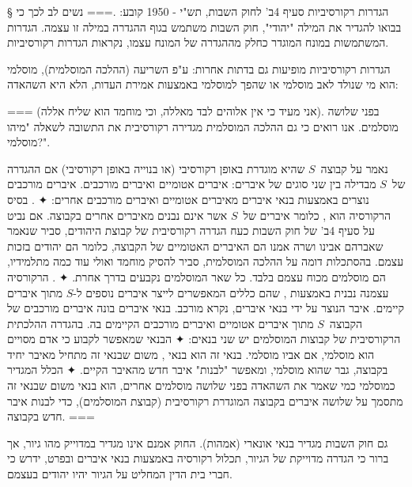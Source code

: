 § הגדרות רקורסיביות
סעיף 4ב' לחוק השבות, תש"י - 1950 קובע:
.===
נשים לב לכך כי בבואו להגדיר את המילה "יהודי", חוק השבות משתמש בגוף ההגדרה במילה
זו עצמה. הגדרות המשתמשות במונח המוגדר כחלק מההגדרה של המונח עצמו, נקראות הגדרות
רקורסיביות.

הגדרות רקורסיביות מופיעות גם בדתות אחרות: ע"פ השריעה (ההלכה המוסלמית), מוסלמי
הוא מי שנולד לאב מוסלמי או שהפך למוסלמי באמצעות אמירת העדות, הלא היא השהאדה:
\begin{Arabic}
\end{Arabic}
===
(אני מעיד כי אין אלוהים לבד מאללה, וכי מוחמד הוא שליח אללה). בפני שלושה
מוסלמים. אנו רואים כי גם ההלכה המוסלמית מגדירה רקורסיבית את התשובה לשאלה "מיהו
מוסלמי?".

נאמר על קבוצה~$S$ שהיא מוגדרת באופן רקורסיבי (או בנוייה באופן רקורסיבי) אם
ההגדרה של~$S$ מבדילה בין שני סוגים של איברים: איברים אטומיים ואיברים מורכבים.
איברים מורכבים נוצרים באמצעות בנאי איברים מאיברים אטומיים ואיברים מורכבים אחרים:
✦ . בסיס הרקורסיה הוא ,
כלומר איברים של~$S$ אשר אינם נבנים מאיברים אחרים בקבוצה. אם נביט על סעיף 4ב' של
חוק השבות כעח הגדרה רקורסיבית של קבוצת היהודים, סביר שנאמר שאברהם אבינו ושרה
אמנו הם האיברים האטומיים של הקבוצה, כלומר הם יהודים בזכות עצמם. בהסתכלות דומה
על ההלכה המוסלמית, סביר להסיק מוחמד ואולי עוד כמה מתלמידיו, הם מוסלמים מכוח
עצמם בלבד. כל שאר המוסלמים נקבעים בדרך אחרת.
✦ . הרקורסיה עצמנה נבנית באמצעות , שהם כללים
המאפשרים לייצר איברים נוספים ל-$S$ מתוך איברים קיימים. איבר הנוצר על ידי בנאי
איברים, נקרא מורכב. בנאי איברים בונה איברים מורכבים של הקבוצה~$S$ מתוך איברים
אטומיים ואיברים מורכבים הקיימים בה. בהגדרה ההלכתית הרקורסיבית של קבוצות
המוסלמים יש שני בנאים:
✦ הבנאי שמאפשר לקבוע כי אדם מסויים הוא מוסלמי, אם אביו מוסלמי. בנאי זה הוא
בנאי , משום שבנאי זה מתחיל מאיבר יחיד בקבוצה, גבר שהוא מוסלמי,
ומאפשר "לבנות" איבר חדש מהאיבר הקיים.
✦ הכלל המגדיר כמוסלמי כמי שאמר את השהאדה בפני שלושה מוסלמים אחרים, הוא
בנאי  משום שבנאי זה מתסמך על שלושה איברים בקבוצה המוגדרת רקורסיבית
(קבוצת המוסלמים), כדי לבנות איבר חדש בקבוצה.
===

גם חוק השבות מגדיר בנאי אונארי (אמהות). החוק אמנם אינו מגדיר
במדוייק מהו גיור, אך ברור כי הגדרה מדוייקת של הגיור, תכלול רקורסיה באמצעות בנאי
איברים ובפרט, ידרש כי חברי בית הדין המחליט על הגיור יהיו יהודים בעצמם.

